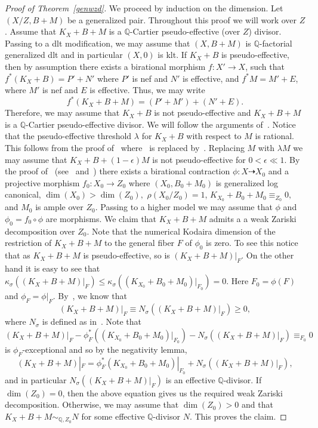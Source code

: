 \documentclass{amsart}
\renewcommand{\qq}{\mathbb{Q}}
\theoremstyle{remark}
\numberwithin{equation}{section}
\begin{document}
\begin{proof}[Proof of Theorem~\ref{genwzd}]
We proceed by induction on the dimension. 
Let $(X/Z,B+M)$ be a generalized pair. Throughout this proof we will work over $Z$. Assume that $K_X+B+M$ is a $\qq$-Cartier pseudo-effective (over $Z$) divisor. Passing to a dlt modification, we may assume that $(X,B+M)$ is $\qq$-factorial generalized dlt and in particular $(X,0)$ is klt.
If $K_X+B$ is pseudo-effective, then by assumption there exists a birational morphism $f\colon X'\rightarrow X$, such that $f^*(K_X+B)=P'+N'$ where $P'$ is nef and $N'$ is effective, 
and $f^*M=M'+E$, where $M'$ is nef and $E$ is effective. Thus, we may write
\[
f^*(K_X+B+M) = (P'+M') + (N'+E).
\]
Therefore, we may assume that $K_X+B$ is not pseudo-effective and $K_X+B+M$ is a $\qq$-Cartier pseudo-effective divisor.
We will follow the arguments of~\cite{Gong15}.
Notice that the pseudo-effective threshold $\lambda$ for $K_X+B$ with respect to $M$ is rational.
This follows from the proof of~\cite[Proposition 8.7]{DHP13} where~\cite[Conjecture 8.2]{DHP13} is replaced by~\cite[Theorem 1.6]{BZ16}.
Replacing $M$ with $\lambda M$ we may assume that $K_X+B+(1-\epsilon)M$ is not pseudo-effective for $0< \epsilon\ll 1$.
By the proof of~\cite[Proposition 8.7]{DHP13} (see~\cite[Lemma 3.1]{Gong15} and~\cite[\S 4]{BZ16}) there exists a birational contraction 
$\phi \colon X\dashrightarrow X_0$ and a projective morphism $f_0 \colon X_0 \rightarrow Z_0$ where $(X_0,B_0+M_0)$ is generalized log canonical, 
$\dim(X_0)>\dim(Z_0),$ $ \rho(X_0/Z_0)=1$, $K_{X_0}+B_0+M_0 \equiv _{Z_0} 0,$ and $M_0$ is ample over $Z_0$.
Passing to a higher model we may assume that $\phi$ and $\phi_0 = f_0 \circ \phi$ are morphisms.
We claim that $K_X+B+M$ admits a a weak Zariski decomposition over $Z_0$.
Note that the numerical Kodaira dimension of the restriction of $K_X+B+M$ to the general fiber $F$ of $\phi_0$ is zero.
To see this notice that as $K_X+B+M$ is pseudo-effective, so is  $(K_X+B+M)|_F$. On the other hand it is easy to see that $\kappa _\sigma ((K_X+B+M)|_F)\leq \kappa _\sigma ((K_{X_0}+B_0+M_0)|_{F_0})=0$. Here $F_0=\phi (F)$ and $\phi _F=\phi |_F$.
By~\cite{Nak04}, we know that 
\begin{equation}\label{num}
(K_X+B+M)|_F \equiv N_\sigma( (K_X+B+M)|_F) \geq 0, 
\end{equation}
where $N_\sigma$ is defined as in~\cite[Chapter 3, 1.12]{Nak04}. 
Note that $$(K_X+B+M)|_F -\phi _F^*((K_{X_0}+B_0+M_0)|_{F_0})- N_\sigma( (K_X+B+M)|_F)\equiv _{F_0}0$$ is $\phi _F$-exceptional and so
by the negativity lemma, $$(K_X+B+M)|_F=\phi _F^*(K_{X_0}+B_0+M_0)|_{F_0}+N_\sigma( (K_X+B+M)|_F),$$ and in particular $N_\sigma( (K_X+B+M)|_F)$ 
is an effective $\qq$-divisor. 
If $\dim(Z_0)=0$, then the above equation gives us the required weak Zariski decomposition. Otherwise, we may assume that $\dim(Z_0)>0$ and that $K_X+B+M \sim_{\qq ,Z_0} N$ for some effective $\qq$-divisor $N$.
This proves the claim.


\end{proof}
\end{document}
